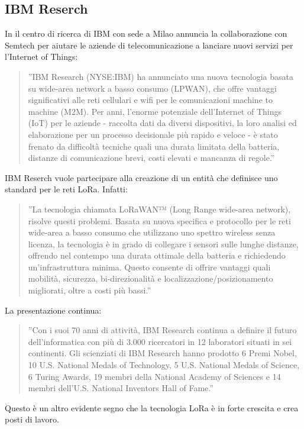 \documentclass[a4paper]{report} %
\begin{document}
\subsection{IBM Reserch}
In \cite{art:rif.26} il centro di ricerca di IBM con sede a Milao annuncia la collaborazione con Semtech per aiutare le aziende di telecomunicazione a lanciare nuovi servizi per l’Internet of Things:
\begin{quote}
	''IBM Research (NYSE:IBM) ha annunciato una nuova tecnologia basata su wide-area network a basso consumo (LPWAN), che offre vantaggi significativi alle reti cellulari e wifi per le comunicazioni machine to machine (M2M).
	Per anni, l'enorme potenziale dell’Internet of Things (IoT) per le aziende - raccolta dati da diversi dispositivi, la loro analisi ed elaborazione per un processo decisionale più rapido e veloce - è stato frenato da difficoltà tecniche quali una durata limitata della batteria, distanze di comunicazione brevi, costi elevati e mancanza di regole.''
\end{quote}
IBM Reserch vuole partecipare alla creazione di un entità che definisce uno standard per le reti LoRa. Infatti:
\begin{quote}
	''La tecnologia chiamata LoRaWAN™ (Long Range wide-area network), risolve questi problemi. Basata su nuova specifica e protocollo per le reti wide-area a basso consumo che utilizzano uno spettro wireless senza licenza, la tecnologia è in grado di collegare i sensori sulle lunghe distanze, offrendo nel contempo una durata ottimale della batteria e richiedendo un'infrastruttura minima. Questo consente di offrire vantaggi quali mobilità, sicurezza, bi-direzionalità e localizzazione/posizionamento migliorati, oltre a costi più bassi.''
\end{quote}
La presentazione continua:
\begin{quote}
	''Con i suoi 70 anni di attività, IBM Research continua a definire il futuro dell'informatica con più di 3.000 ricercatori in 12 laboratori situati in sei continenti. Gli scienziati di IBM Research hanno prodotto 6 Premi Nobel, 10 U.S. National Medals of Technology, 5 U.S. National Medals of Science, 6 Turing Awards, 19 membri della National Academy of Sciences e 14 membri dell'U.S. National Inventors Hall of Fame.'' 
\end{quote}
Questo è un altro evidente segno che la tecnologia LoRa è in forte crescita  e crea posti di lavoro.
\end{document}
